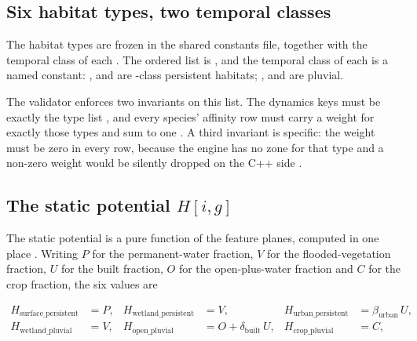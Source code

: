 \documentclass[11pt,a4paper]{article} \usepackage[utf8]{inputenc} \usepackage{lmodern} \usepackage[T1]{fontenc}
\begin{document}
\subsection{Six habitat types, two temporal classes}

The habitat types are frozen in the shared constants file, together with the temporal class of
each . The ordered list is
, and the temporal class of each is a named constant:
,
 and
 are
-class persistent habitats;
,  and
 are pluvial.

The validator enforces two invariants on this list. The dynamics keys must be exactly the type
list , and every species' affinity
row must carry a weight for exactly those types and sum to one
. A third invariant is specific: the
 weight must be zero in every row, because the engine has no zone for
that type and a non-zero weight would be silently dropped on the C++ side
.

\subsection{The static potential $H[i,g]$}

The static potential is a pure function of the  feature
planes, computed in one place
. Writing $P$ for the permanent-water
fraction, $V$ for the flooded-vegetation fraction, $U$ for the built fraction, $O$ for the
open-plus-water fraction and $C$ for the crop fraction, the six values are

\begin{align}
H_{\text{surface\_persistent}} &= P, & H_{\text{wetland\_persistent}} &= V, &
H_{\text{urban\_persistent}} &= \beta_{\text{urban}}\, U, \\ H_{\text{wetland\_pluvial}} &= V, &
H_{\text{open\_pluvial}} &= O + \delta_{\text{built}}\, U, & H_{\text{crop\_pluvial}} &= C,
\end{align}
\end{document}
